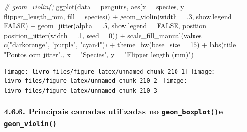\documentclass[
]{book}
\newenvironment{Shaded}{\begin{snugshade}}{\end{snugshade}}
\newcommand{\AttributeTok}[1]{\textcolor[rgb]{0.61,0.61,0.61}{#1}}
\newcommand{\CommentTok}[1]{\textcolor[rgb]{0.37,0.37,0.37}{\textit{#1}}}
\newcommand{\ConstantTok}[1]{\textcolor[rgb]{0,0,0}{#1}}
\newcommand{\DecValTok}[1]{\textcolor[rgb]{0.06,0.06,0.06}{#1}}
\newcommand{\FunctionTok}[1]{\textcolor[rgb]{0,0,0}{#1}}
\newcommand{\NormalTok}[1]{#1}
\newcommand{\SpecialCharTok}[1]{\textcolor[rgb]{0,0,0}{#1}}
\newcommand{\StringTok}[1]{\textcolor[rgb]{0.5,0.5,0.5}{#1}}
\begin{document}
\begin{Shaded}
\begin{Highlighting}[]
\CommentTok{\# geom\_violin()}
\FunctionTok{ggplot}\NormalTok{(}\AttributeTok{data =}\NormalTok{ penguins, }
       \FunctionTok{aes}\NormalTok{(}\AttributeTok{x =}\NormalTok{ species, }\AttributeTok{y =}\NormalTok{ flipper\_length\_mm, }\AttributeTok{fill =}\NormalTok{ species)) }\SpecialCharTok{+}
  \FunctionTok{geom\_violin}\NormalTok{(}\AttributeTok{width =}\NormalTok{ .}\DecValTok{3}\NormalTok{, }
              \AttributeTok{show.legend =} \ConstantTok{FALSE}\NormalTok{) }\SpecialCharTok{+}
  \FunctionTok{geom\_jitter}\NormalTok{(}\AttributeTok{alpha =}\NormalTok{ .}\DecValTok{5}\NormalTok{, }
              \AttributeTok{show.legend =} \ConstantTok{FALSE}\NormalTok{, }
              \AttributeTok{position =} \FunctionTok{position\_jitter}\NormalTok{(}\AttributeTok{width =}\NormalTok{ .}\DecValTok{1}\NormalTok{, }\AttributeTok{seed =} \DecValTok{0}\NormalTok{)) }\SpecialCharTok{+}
  \FunctionTok{scale\_fill\_manual}\NormalTok{(}\AttributeTok{values =} \FunctionTok{c}\NormalTok{(}\StringTok{"darkorange"}\NormalTok{, }\StringTok{"purple"}\NormalTok{, }\StringTok{"cyan4"}\NormalTok{)) }\SpecialCharTok{+}
  \FunctionTok{theme\_bw}\NormalTok{(}\AttributeTok{base\_size =} \DecValTok{16}\NormalTok{) }\SpecialCharTok{+}
  \FunctionTok{labs}\NormalTok{(}\AttributeTok{title =} \StringTok{"Pontos com jitter"}\NormalTok{,, }\AttributeTok{x =} \StringTok{"Species"}\NormalTok{, }\AttributeTok{y =} \StringTok{"Flipper length (mm)"}\NormalTok{)}
\end{Highlighting}
\end{Shaded}

\begin{center}\texttt{[image: livro\_files/figure-latex/unnamed-chunk-210-1]} \texttt{[image: livro\_files/figure-latex/unnamed-chunk-210-2]} \texttt{[image: livro\_files/figure-latex/unnamed-chunk-210-3]} \end{center}

\hypertarget{principais-camadas-utilizadas-no-geom_boxplote-geom_violin}{%
\subsubsection{\texorpdfstring{4.6.6. Principais camadas utilizadas no \texttt{geom\_boxplot()}e \texttt{geom\_violin()}}{4.6.6. Principais camadas utilizadas no geom\_boxplot()e geom\_violin()}}\label{principais-camadas-utilizadas-no-geom_boxplote-geom_violin}}
\end{document}
